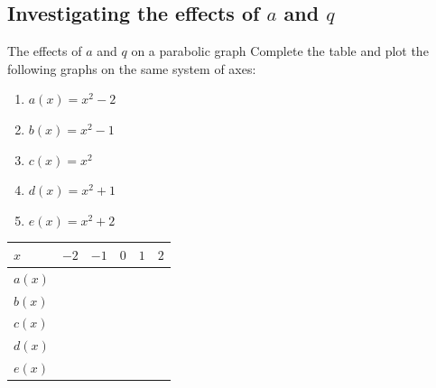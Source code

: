 \subsection*{Investigating the effects of $a$ and $q$ }
\begin{Investigation}{The effects of $a$ and $q$ on a parabolic graph}
Complete the table and plot the following graphs on the same system of axes:
    \begin{enumerate}[noitemsep, label=\textbf{\arabic*}. ] 
  \item $a(x)={x}^{2}-2$
    \item $b(x)={x}^{2}-1$
    \item $c(x)={x}^{2}$
    \item $d(x)={x}^{2}+1$
    \item $e(x)={x}^{2}+2$
        \end{enumerate}

\begin{table}[H]
\begin{center}

\noindent

\begin{tabular}{|l|l|l|l|l|l|}\hline
 $x$&
$-2$&
$-1$&
$0$&
$1$&
$2$
\\ \hline


$a(x)$
&
&
&
&
&
\\ \hline

$b(x)$
&
&
&%
&
&
\\ \hline

$c(x)$
&
&
&
&
&
\\ \hline

$d(x)$
&
&
&
&
&
\\ \hline

$e(x)$
&
&
&
&
&
\\ \hline


\end{tabular}
\end{center}
\end{table}
\end{Investigation}

